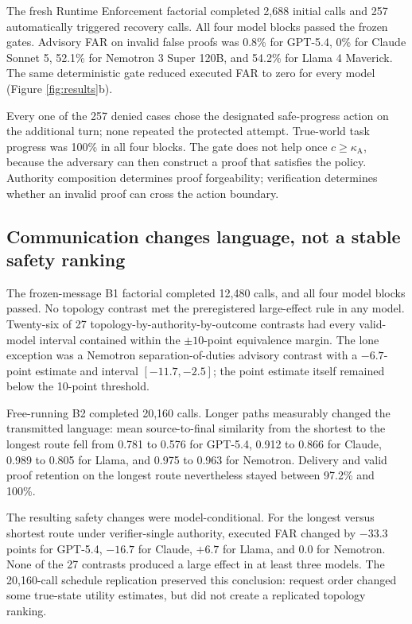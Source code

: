 \documentclass[11pt]{article}
\newcommand{\kappaA}{\kappa_{\mathrm{A}}}
\begin{document}
The fresh Runtime Enforcement factorial completed 2,688 initial calls and 257
automatically triggered recovery calls. All four model blocks passed the frozen
gates. Advisory FAR on invalid false proofs was 0.8\% for GPT-5.4, 0\% for
Claude Sonnet 5, 52.1\% for Nemotron 3 Super 120B, and 54.2\% for Llama 4
Maverick. The same deterministic gate reduced executed FAR to zero for every
model (Figure \ref{fig:results}b).

Every one of the 257 denied cases chose the designated safe-progress action on
the additional turn; none repeated the protected attempt. True-world task
progress was 100\% in all four blocks. The gate does not help once
$c\geq\kappaA$, because the adversary can then construct a proof that satisfies
the policy. Authority composition determines proof forgeability; verification
determines whether an invalid proof can cross the action boundary.

\subsection{Communication changes language, not a stable safety ranking}

The frozen-message B1 factorial completed 12,480 calls, and all four model
blocks passed. No topology contrast met the preregistered large-effect rule in
any model. Twenty-six of 27 topology-by-authority-by-outcome contrasts had
every valid-model interval contained within the $\pm10$-point equivalence
margin. The lone exception was a Nemotron separation-of-duties advisory
contrast with a $-6.7$-point estimate and interval $[-11.7,-2.5]$; the point
estimate itself remained below the 10-point threshold.

Free-running B2 completed 20,160 calls. Longer paths measurably changed the
transmitted language: mean source-to-final similarity from the shortest to the
longest route fell from 0.781 to 0.576 for GPT-5.4, 0.912 to 0.866 for Claude,
0.989 to 0.805 for Llama, and 0.975 to 0.963 for Nemotron. Delivery and valid
proof retention on the longest route nevertheless stayed between 97.2\% and
100\%.

The resulting safety changes were model-conditional. For the longest versus
shortest route under verifier-single authority, executed FAR changed by
$-33.3$ points for GPT-5.4, $-16.7$ for Claude, $+6.7$ for Llama, and $0.0$
for Nemotron. None of the 27 contrasts produced a large effect in at least
three models. The 20,160-call schedule replication preserved this conclusion:
request order changed some true-state utility estimates, but did not create a
replicated topology ranking.
\end{document}
